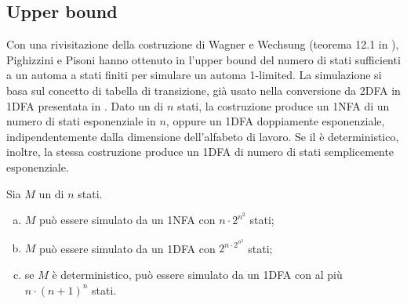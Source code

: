 \subsection{Upper bound}
Con una rivisitazione della costruzione di Wagner e Wechsung (teorema 12.1 in \cite{Wagner:86:compCompl}), Pighizzini e Pisoni hanno ottenuto in \cite{Pighizzini:14:limitedRE} l'upper bound del numero di stati sufficienti a un automa a stati finiti per simulare un automa 1-limited. La simulazione si basa sul concetto di tabella di transizione, già usato nella conversione da 2DFA in 1DFA presentata in \cite{Shepherdson:59:reduction2to1way}. Dato un  di $n$ stati, la costruzione produce un 1NFA di un numero di stati esponenziale in $n$, oppure un 1DFA doppiamente esponenziale, indipendentemente dalla dimensione dell'alfabeto di lavoro. Se il  è deterministico, inoltre, la stessa costruzione produce un 1DFA di numero di stati semplicemente esponenziale.
\begin{theor}\label{thm:a1l:upper}
	Sia $M$ un  di $n$ stati.
	\begin{enumerate}[(a)]
		\item \label{itm:a1l:up:NFA} $M$ può essere simulato da un 1NFA con $n\cdot2^{n^2}$ stati;
		\item \label{itm:a1l:up:DFA} $M$ può essere simulato da un 1DFA con $2^{n\cdot2^{n^2}}$ stati;
		\item \label{itm:a1l:up:det} se $M$ è deterministico, può essere simulato da un 1DFA con al più $n\cdot (n+1)^n$ stati.
	\end{enumerate}
\end{theor}
